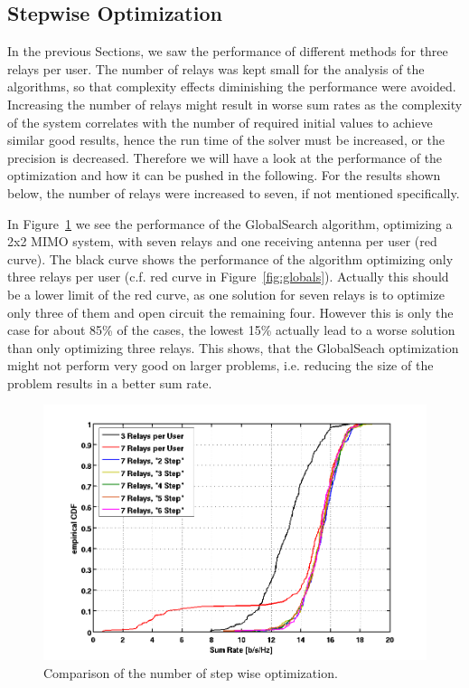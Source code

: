 \subsection{Stepwise Optimization}
\label{sec:stepwise}
In the previous Sections, we saw the performance of different methods for three relays per user.
The number of relays was kept small for the analysis of the algorithms, so that complexity effects diminishing the performance were avoided.
Increasing the number of relays might result in worse sum rates as the complexity of the system correlates with the number of required initial values to achieve similar good results, hence the run time of the solver must be increased, or the precision is decreased.
Therefore we will have a look at the performance of the optimization and how it can be pushed in the following.
For the results shown below, the number of relays were increased to seven, if not mentioned specifically.

In Figure~\ref{fig:nrel7} we see the performance of the GlobalSearch algorithm, optimizing a 2x2 MIMO system, with seven relays and one receiving antenna per user (red curve).
The black curve shows the performance of the algorithm optimizing only three relays per user (c.f.  red curve in Figure~\ref{fig:globals}).
Actually this should be a lower limit of the red curve, as one solution for seven relays is to optimize only three of them and open circuit the remaining four.
However this is only the case for about 85\% of the cases, the lowest 15\% actually lead to a worse solution than only optimizing three relays.
This shows, that the GlobalSeach optimization might not perform very good on larger problems, i.e. reducing the size of the problem results in a better sum rate.

\begin{figure}[h]
\centering
  \includegraphics[width=0.9\linewidth]{images/Relstepcomparison_edited.png}
\caption{Comparison of the number of step wise optimization.}
\label{fig:nrel7}
\end{figure}

